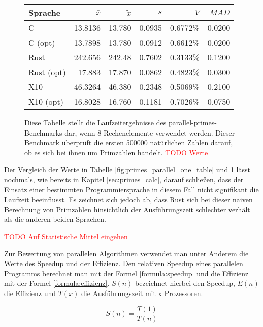 \begin{figure}[hb]
	\begin{center}
		\begin{tabular}{lrrrrr}
			\toprule
			Sprache & $\bar{x}$ & $\tilde{x}$ & $s$ & $V$ & $MAD$ \\
			\midrule
			C          & 13.8136 & 13.780 & 0.0935 & 0.6772\% & 0.0200 \\
			C (opt)    & 13.7898 & 13.780 & 0.0912 & 0.6612\% & 0.0200 \\
			Rust       & 242.656 & 242.48 & 0.7602 & 0.3133\% & 0.1200 \\
			Rust (opt) & 17.883 & 17.870 & 0.0862 & 0.4823\% & 0.0300 \\
			X10        & 46.3264 & 46.380 & 0.2348 & 0.5069\% & 0.2100 \\
			X10 (opt)  & 16.8028 & 16.760 & 0.1181 & 0.7026\% & 0.0750 \\
			\bottomrule
		\end{tabular}
	\end{center}
	\caption{
		Diese Tabelle stellt die Laufzeitergebnisse des parallel-primes-Benchmarks dar,
		wenn 8 Rechenelemente verwendet werden.
		Dieser Benchmark überprüft die ersten 500000 natürlichen Zahlen darauf,
		ob es sich bei ihnen um Primzahlen handelt.
		\textcolor{red}{TODO Werte}
	}
	\label{fig:primes_parallel_eight_table}
\end{figure}

Der Vergleich der Werte in Tabelle \ref{fig:primes_parallel_one_table} und \ref{fig:primes_parallel_eight_table} 
lässt nochmals, wie bereits in Kapitel \ref{sec:primes_calc}, darauf schließen, dass der Einsatz einer bestimmten
Programmiersprache in diesem Fall nicht signifikant die Laufzeit beeinflusst. Es zeichnet sich jedoch ab, dass
Rust sich bei dieser naiven Berechnung von Primzahlen hinsichtlich der Ausführungszeit schlechter verhält als
die anderen beiden Sprachen.

\textcolor{red}{TODO Auf Statistische Mittel eingehen}

Zur Bewertung von parallelen Algorithmen verwendet man unter Anderem die Werte des Speedup und der Effizienz.
Den relativen Speedup eines parallelen Programms berechnet man mit der Formel \ref{formula:speedup} und die
Effizienz mit der Formel \ref{formula:effizienz}. $S(n)$ bezeichnet hierbei den Speedup, $E(n)$ die Effizienz
und $T(x)$ die Ausführungszeit mit x Prozessoren.

\begin{equation}
	\label{formula:speedup}
	S(n) = \frac{T(1)}{T(n)}
\end{equation}



